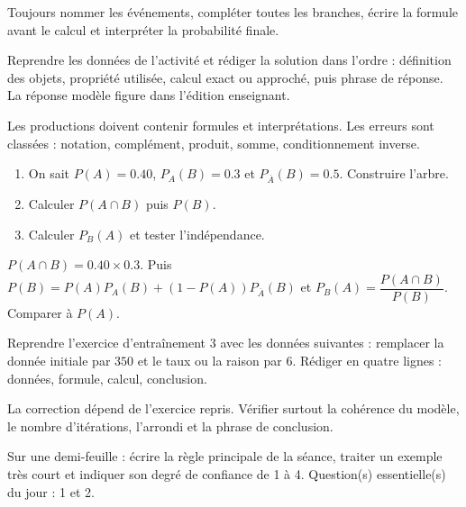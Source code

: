 \begin{summary}Toujours nommer les événements, compléter toutes les branches, écrire la formule avant le calcul et interpréter la probabilité finale.\end{summary}

\begin{example}
Reprendre les données de l'activité et rédiger la solution dans l'ordre : définition des objets, propriété utilisée, calcul exact ou approché, puis phrase de réponse. La réponse modèle figure dans l'édition enseignant.
\end{example}
\begin{solution}Les productions doivent contenir formules et interprétations. Les erreurs sont classées : notation, complément, produit, somme, conditionnement inverse.\end{solution}

\begin{exercise}[essentiel]
\begin{enumerate}\item On sait $P(A)=\num{0,40}$, $P_A(B)=\num{0,3}$ et $P_{\overline A}(B)=\num{0,5}$. Construire l'arbre.\item Calculer $P(A\cap B)$ puis $P(B)$.\item Calculer $P_B(A)$ et tester l'indépendance.\end{enumerate}
\end{exercise}
\begin{solution}$P(A\cap B)=\num{0,40}\times\num{0,3}$. Puis $P(B)=P(A)P_A(B)+(1-P(A))P_{\overline A}(B)$ et $P_B(A)=\dfrac{P(A\cap B)}{P(B)}$. Comparer à $P(A)$.\end{solution}


\begin{homework}Reprendre l'exercice d'entraînement 3 avec les données suivantes : remplacer la donnée initiale par $350$ et le taux ou la raison par $6$. Rédiger en quatre lignes : données, formule, calcul, conclusion.\end{homework}
\begin{solution}La correction dépend de l'exercice repris. Vérifier surtout la cohérence du modèle, le nombre d'itérations, l'arrondi et la phrase de conclusion.\end{solution}

\begin{exitticket}[3 minutes]Sur une demi-feuille : écrire la règle principale de la séance, traiter un exemple très court et indiquer son degré de confiance de 1 à 4. Question(s) essentielle(s) du jour : 1 et 2.\end{exitticket}

